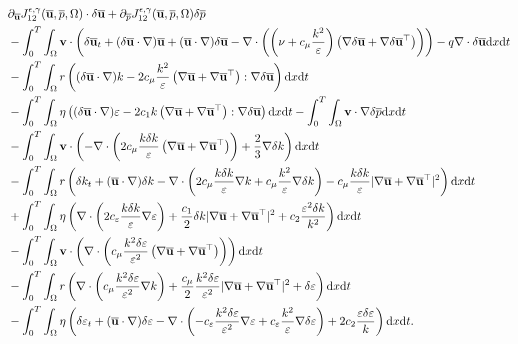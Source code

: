 \documentclass[oneside,11pt]{book}
\numberwithin{equation}{section}
\begin{document}
{\color{blue}\begin{align*}
        &\partial_{\overline{\bf u}}J_{12}^{\epsilon,\gamma}(\overline{\bf u},\overline{p},\Omega)\cdot\delta\overline{\bf u} + \partial_{\overline{p}}J_{12}^{\epsilon,\gamma}(\overline{\bf u},\overline{p},\Omega)\delta\overline{p}\\
        &-\int_0^T\int_\Omega {\bf v}\cdot\left(\delta\overline{\bf u}_t + (\delta\overline{\bf u}\cdot\nabla)\overline{\bf u} + (\overline{\bf u}\cdot\nabla)\delta\overline{\bf u} - \nabla\cdot\left(\left(\nu + c_\mu\frac{k^2}{\varepsilon}\right)\left(\nabla\delta\overline{\bf u} + \nabla\delta\overline{\bf u}^\top\right)\right)\right) - q\nabla\cdot\delta\overline{\bf u}{\rm d}x{\rm d}t\\
        &-\int_0^T\int_\Omega r\left((\delta\overline{\bf u}\cdot\nabla)k - 2c_\mu\frac{k^2}{\varepsilon}\left(\nabla\overline{\bf u} + \nabla\overline{\bf u}^\top\right):\nabla\delta\overline{\bf u}\right){\rm d}x{\rm d}t\\
        &-\int_0^T\int_\Omega \eta\left((\delta\overline{\bf u}\cdot\nabla)\varepsilon - 2c_1k\left(\nabla\overline{\bf u} + \nabla\overline{\bf u}^\top\right):\nabla\delta\overline{\bf u}\right){\rm d}x{\rm d}t - \int_0^T\int_\Omega {\bf v}\cdot\nabla\delta\overline{p}{\rm d}x{\rm d}t\\
        &-\int_0^T\int_\Omega {\bf v}\cdot\left(-\nabla\cdot\left(2c_\mu\frac{k\delta k}{\varepsilon}\left(\nabla\overline{\bf u} + \nabla\overline{\bf u}^\top\right)\right) + \frac{2}{3}\nabla\delta k\right){\rm d}x{\rm d}t\\
        &-\int_0^T\int_\Omega r\left(\delta k_t + (\overline{\bf u}\cdot\nabla)\delta k - \nabla\cdot\left(2c_\mu\frac{k\delta k}{\varepsilon}\nabla k + c_\mu\frac{k^2}{\varepsilon}\nabla\delta k\right) - c_\mu\frac{k\delta k}{\varepsilon}|\nabla\overline{\bf u} + \nabla\overline{\bf u}^\top|^2\right){\rm d}x{\rm d}t\\
        &+\int_0^T\int_\Omega \eta\left(\nabla\cdot\left(2c_\varepsilon\frac{k\delta k}{\varepsilon}\nabla\varepsilon\right) + \frac{c_1}{2}\delta k|\nabla\overline{\bf u} + \nabla\overline{\bf u}^\top|^2 + c_2\frac{\varepsilon^2\delta k}{k^2}\right){\rm d}x{\rm d}t\\
        &-\int_0^T\int_\Omega {\bf v}\cdot\left(\nabla\cdot\left(c_\mu\frac{k^2\delta\varepsilon}{\varepsilon^2}\left(\nabla\overline{\bf u} + \nabla\overline{\bf u}^\top\right)\right)\right){\rm d}x{\rm d}t\\
        &-\int_0^T\int_\Omega r\left(\nabla\cdot\left(c_\mu\frac{k^2\delta\varepsilon}{\varepsilon^2}\nabla k\right) + \frac{c_\mu}{2}\frac{k^2\delta\varepsilon}{\varepsilon^2}|\nabla\overline{\bf u} + \nabla\overline{\bf u}^\top|^2 + \delta\varepsilon\right){\rm d}x{\rm d}t\\
        &-\int_0^T\int_\Omega \eta\left(\delta\varepsilon_t + (\overline{\bf u}\cdot\nabla)\delta\varepsilon - \nabla\cdot\left(-c_\varepsilon\frac{k^2\delta\varepsilon}{\varepsilon^2}\nabla\varepsilon + c_\varepsilon\frac{k^2}{\varepsilon}\nabla\delta\varepsilon\right) + 2c_2\frac{\varepsilon\delta\varepsilon}{k}\right){\rm d}x{\rm d}t.
\end{align*}}
\end{document}

